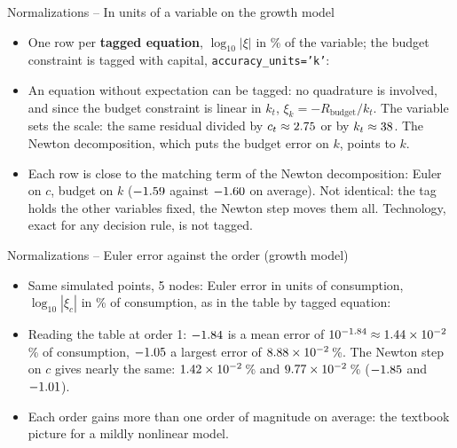 \documentclass[11pt,aspectratio=169]{beamer}
\newcommand{\code}[1]{\texttt{#1}}
\begin{document}
\begin{frame}{Normalizations -- In units of a variable on the growth model}

\begin{itemize}

\item One row per \textbf{tagged equation}, $\log_{10}|\xi|$ in \% of the variable; the budget constraint is tagged with capital, \code{accuracy\_units='k'}:
\begin{center}
\small

\end{center}

\item An equation without expectation can be tagged: no quadrature is involved, and since the budget constraint is linear in $k_t$, $\xi_k = -R_{\text{budget}}/k_t$. The variable sets the scale: the same residual divided by $c_t\approx2.75$ or by $k_t\approx38$. The Newton decomposition, which puts the budget error on $k$, points to $k$.\newline

\item Each row is close to the matching term of the Newton decomposition: Euler on $c$, budget on $k$ ($-1.59$ against $-1.60$ on average). Not identical: the tag holds the other variables fixed, the Newton step moves them all. Technology, exact for any decision rule, is not tagged.

\end{itemize}

\end{frame}

\begin{frame}{Normalizations -- Euler error against the order (growth model)}

\begin{itemize}

\item Same \growthSimPoints{} simulated points, 5 nodes: Euler error in units of consumption, $\log_{10}|\xi_c|$ in \% of consumption, as in the table by tagged equation:
\begin{center}
\small
\renewcommand{\arraystretch}{1.2}

\end{center}

\medskip

\item Reading the table at order 1: $-1.84$ is a mean error of $10^{-1.84}\approx1.44\times10^{-2}$\,\% of consumption, $-1.05$ a largest error of $8.88\times10^{-2}$\,\%. The Newton step on $c$ gives nearly the same: $1.42\times10^{-2}$\,\% and $9.77\times10^{-2}$\,\% ($-1.85$ and $-1.01$).\newline

\item Each order gains more than one order of magnitude on average: the textbook picture for a mildly nonlinear model.

\end{itemize}

\end{frame}
\end{document}
